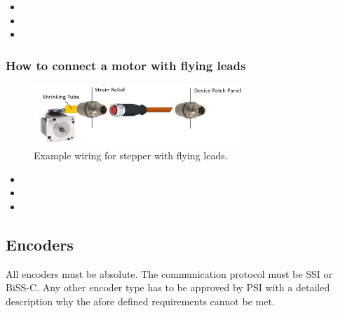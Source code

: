 \begin{itemize}
    \item {}
    \item {}
    \item {}
\end{itemize}

\subsubsection{How to connect a motor with flying leads}
\begin{figure}[H]
\centering
\includegraphics[width=0.7\textwidth]{Figures/StepperFlyingLeads.jpg}
\caption{\label{fig:StepperFlyingLeads}Example wiring for stepper with flying leads.}
\end{figure}

\begin{itemize}
    \item {}
    \item {}
    \item {}
\end{itemize}

\subsection{Encoders}
All encoders must be absolute. The communication protocol must be SSI or BiSS-C. Any other encoder type has to be approved by PSI with a detailed description why the afore defined requirements cannot be met.

